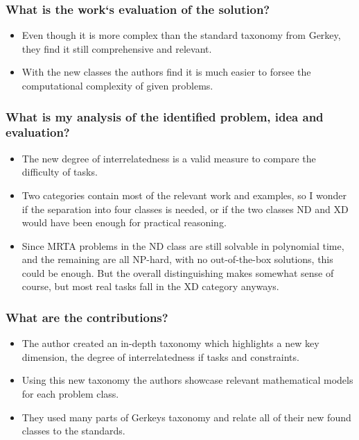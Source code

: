     \subsubsection*{What is the work`s evaluation of the solution?}
    \begin{itemize}
        \item Even though it is more complex than the standard taxonomy from Gerkey, they find it still comprehensive and relevant. 
        \item With the new classes the authors find it is much easier to forsee the computational complexity of given problems.
    \end{itemize}
    \subsubsection*{What is my analysis of the identified problem, idea and evaluation?}
    \begin{itemize}
        \item The new degree of interrelatedness is a valid measure to compare the difficulty of tasks. 
        \item Two categories contain most of the relevant work and examples, so I wonder if the separation into four classes is needed, or if the two classes ND and XD would have been enough for practical reasoning. 
        \item Since MRTA problems in the ND class are still solvable in polynomial time, and the remaining are all NP-hard, with no out-of-the-box solutions, this could be enough. But the overall distinguishing makes somewhat sense of course, but most real tasks fall in the XD category anyways.
    \end{itemize}
    \subsubsection*{What are the contributions?}
    \begin{itemize}
        \item The author created an in-depth taxonomy which highlights a new key dimension, the degree of interrelatedness if tasks and constraints.
        \item Using this new taxonomy the authors showcase relevant mathematical models for each problem class.
        \item They used many parts of Gerkeys taxonomy and relate all of their new found classes to the standards. 
    \end{itemize}
